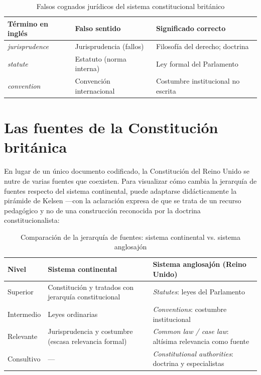 \documentclass[12pt,oneside]{book}
\begin{document}
\begin{table}[H]
\centering
\caption{Falsos cognados jurídicos del sistema constitucional británico}
\begin{tabularx}{\textwidth}{>{\raggedright\arraybackslash}p{} >{\raggedright\arraybackslash}p{} >{\raggedright\arraybackslash}X}
\toprule
\textbf{Término en inglés} & \textbf{Falso sentido} & \textbf{Significado correcto} \\
\midrule
\textit{jurisprudence} & Jurisprudencia (fallos) & Filosofía del derecho; doctrina \\
\textit{statute} & Estatuto (norma interna) & Ley formal del Parlamento \\
\textit{convention} & Convención internacional & Costumbre institucional no escrita \\
\bottomrule
\end{tabularx}
\end{table}

\section{Las fuentes de la Constitución británica}

En lugar de un único documento codificado, la Constitución del Reino Unido se nutre de varias fuentes que coexisten. Para visualizar cómo cambia la jerarquía de fuentes respecto del sistema continental, puede adaptarse didácticamente la pirámide de Kelsen ---con la aclaración expresa de que se trata de un recurso pedagógico y no de una construcción reconocida por la doctrina constitucionalista:

\begin{table}[H]
\centering
\caption{Comparación de la jerarquía de fuentes: sistema continental vs. sistema anglosajón}
\begin{tabularx}{\textwidth}{>{\raggedright\arraybackslash}p{} >{\raggedright\arraybackslash}p{} >{\raggedright\arraybackslash}X}
\toprule
\textbf{Nivel} & \textbf{Sistema continental} & \textbf{Sistema anglosajón (Reino Unido)} \\
\midrule
Superior & Constitución y tratados con jerarquía constitucional & \textit{Statutes}: leyes del Parlamento \\
Intermedio & Leyes ordinarias & \textit{Conventions}: costumbre institucional \\
Relevante & Jurisprudencia y costumbre (escasa relevancia formal) & \textit{Common law / case law}: altísima relevancia como fuente \\
Consultivo & --- & \textit{Constitutional authorities}: doctrina y especialistas \\
\bottomrule
\end{tabularx}
\end{table}
\end{document}
